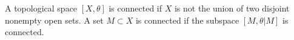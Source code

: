 A topological space $[X, \theta]$ is connected if $X$ is not the union of two disjoint nonempty open sets. A set $M \subset X$ is connected if the subspace $[M, \theta|M]$ is connected.
